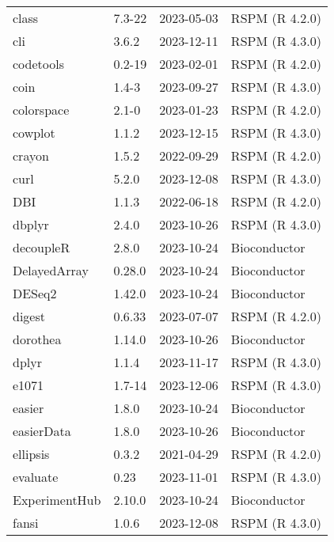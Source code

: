 \begin{tabular}{llll}
class & 7.3-22 & 2023-05-03 & RSPM (R 4.2.0)\\
cli & 3.6.2 & 2023-12-11 & RSPM (R 4.3.0)\\
codetools & 0.2-19 & 2023-02-01 & RSPM (R 4.2.0)\\
coin & 1.4-3 & 2023-09-27 & RSPM (R 4.3.0)\\
\addlinespace
colorspace & 2.1-0 & 2023-01-23 & RSPM (R 4.2.0)\\
cowplot & 1.1.2 & 2023-12-15 & RSPM (R 4.3.0)\\
crayon & 1.5.2 & 2022-09-29 & RSPM (R 4.2.0)\\
curl & 5.2.0 & 2023-12-08 & RSPM (R 4.3.0)\\
\addlinespace
DBI & 1.1.3 & 2022-06-18 & RSPM (R 4.2.0)\\
dbplyr & 2.4.0 & 2023-10-26 & RSPM (R 4.3.0)\\
decoupleR & 2.8.0 & 2023-10-24 & Bioconductor\\
DelayedArray & 0.28.0 & 2023-10-24 & Bioconductor\\
DESeq2 & 1.42.0 & 2023-10-24 & Bioconductor\\
\addlinespace
digest & 0.6.33 & 2023-07-07 & RSPM (R 4.2.0)\\
dorothea & 1.14.0 & 2023-10-26 & Bioconductor\\
dplyr & 1.1.4 & 2023-11-17 & RSPM (R 4.3.0)\\
e1071 & 1.7-14 & 2023-12-06 & RSPM (R 4.3.0)\\
easier & 1.8.0 & 2023-10-24 & Bioconductor\\
\addlinespace
easierData & 1.8.0 & 2023-10-26 & Bioconductor\\
ellipsis & 0.3.2 & 2021-04-29 & RSPM (R 4.2.0)\\
evaluate & 0.23 & 2023-11-01 & RSPM (R 4.3.0)\\
ExperimentHub & 2.10.0 & 2023-10-24 & Bioconductor\\
fansi & 1.0.6 & 2023-12-08 & RSPM (R 4.3.0)\\
\end{tabular}
\pagebreak

